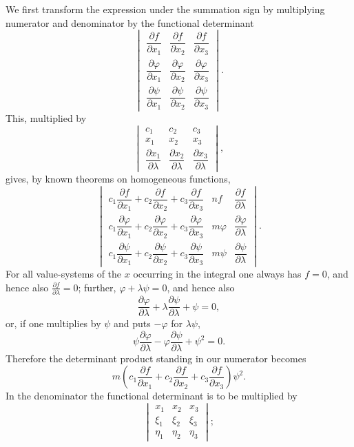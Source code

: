 \documentclass[10pt]{article}
\begin{document}
We first transform the expression under the summation sign by multiplying numerator and denominator by the functional determinant
\[
\begin{vmatrix}
\dfrac{\partial f}{\partial x_1}&\dfrac{\partial f}{\partial x_2}&\dfrac{\partial f}{\partial x_3}\\
\dfrac{\partial\varphi}{\partial x_1}&\dfrac{\partial\varphi}{\partial x_2}&\dfrac{\partial\varphi}{\partial x_3}\\
\dfrac{\partial\psi}{\partial x_1}&\dfrac{\partial\psi}{\partial x_2}&\dfrac{\partial\psi}{\partial x_3}
\end{vmatrix}.
\]
This, multiplied by
\[
\begin{vmatrix}
c_1&c_2&c_3\\
x_1&x_2&x_3\\
\dfrac{\partial x_1}{\partial\lambda}&\dfrac{\partial x_2}{\partial\lambda}&\dfrac{\partial x_3}{\partial\lambda}
\end{vmatrix},
\]
gives, by known theorems on homogeneous functions,
\[
\begin{vmatrix}
c_1\dfrac{\partial f}{\partial x_1}+c_2\dfrac{\partial f}{\partial x_2}+c_3\dfrac{\partial f}{\partial x_3} & nf & \dfrac{\partial f}{\partial\lambda}\\
c_1\dfrac{\partial\varphi}{\partial x_1}+c_2\dfrac{\partial\varphi}{\partial x_2}+c_3\dfrac{\partial\varphi}{\partial x_3} & m\varphi & \dfrac{\partial\varphi}{\partial\lambda}\\
c_1\dfrac{\partial\psi}{\partial x_1}+c_2\dfrac{\partial\psi}{\partial x_2}+c_3\dfrac{\partial\psi}{\partial x_3} & m\psi & \dfrac{\partial\psi}{\partial\lambda}
\end{vmatrix}.
\]
For all value-systems of the $x$ occurring in the integral one always has $f=0$, and hence also $\frac{\partial f}{\partial\lambda}=0$; further, $\varphi+\lambda\psi=0$, and hence also
\[
\frac{\partial\varphi}{\partial\lambda}+\lambda\frac{\partial\psi}{\partial\lambda}+\psi=0,
\]
or, if one multiplies by $\psi$ and puts $-\varphi$ for $\lambda\psi$,
\[
\psi\frac{\partial\varphi}{\partial\lambda}-\varphi\frac{\partial\psi}{\partial\lambda}+\psi^2=0.
\]
Therefore the determinant product standing in our numerator becomes
\[
m\left(c_1\frac{\partial f}{\partial x_1}+c_2\frac{\partial f}{\partial x_2}+c_3\frac{\partial f}{\partial x_3}\right)\psi^2.
\]
In the denominator the functional determinant is to be multiplied by
\[
\begin{vmatrix}
x_1&x_2&x_3\\
\xi_1&\xi_2&\xi_3\\
\eta_1&\eta_2&\eta_3
\end{vmatrix};
\]
\end{document}
